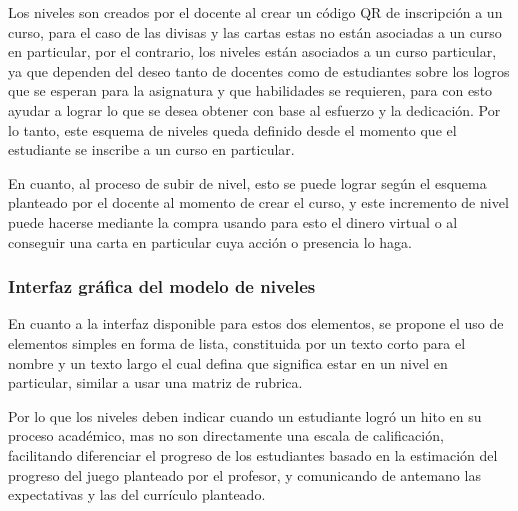Los niveles son creados por el docente al crear un código QR de inscripción a un curso, para el caso de las 
divisas y las cartas estas no están asociadas a un curso en particular, por el contrario, los niveles están 
asociados a un curso particular, ya que dependen del deseo tanto de docentes como de estudiantes sobre los 
logros que se esperan para la asignatura y que habilidades se requieren, para con esto ayudar a lograr lo que 
se desea obtener con base al esfuerzo y la dedicación. Por lo tanto, este esquema de niveles queda definido 
desde el momento que el estudiante se inscribe a un curso en particular.

En cuanto, al proceso de subir de nivel, esto se puede lograr según el esquema planteado por el docente al 
momento de crear el curso, y este incremento de nivel puede hacerse mediante la compra usando para esto el 
dinero virtual o al conseguir una carta en particular cuya acción o presencia lo haga.

\subsubsection{Interfaz gráfica del modelo de niveles}

En cuanto a la interfaz disponible para estos dos elementos, se propone el uso de elementos simples en forma
de lista, constituida por un texto corto para el nombre y un texto largo el cual defina que significa
estar en un nivel en particular, similar a usar una matriz de rubrica.

Por lo que los niveles deben indicar cuando un estudiante logró un hito en su proceso académico, mas no son 
directamente una escala de calificación, facilitando diferenciar el progreso de los estudiantes basado en la 
estimación del progreso del juego planteado por el profesor, y comunicando de antemano las expectativas y las 
del currículo planteado.

